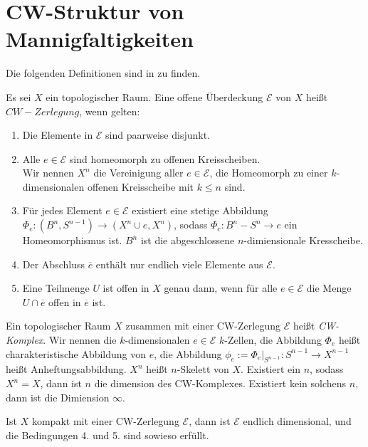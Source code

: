 \section{CW-Struktur von Mannigfaltigkeiten}

Die folgenden Definitionen sind in \cite{dold} zu finden.

\begin{definition}
    \label{def: cw-komplex}
    Es sei $X$ ein topologischer Raum. Eine offene Überdeckung $\mathcal{E}$ von $X$ heißt 
    $CW-Zerlegung$, wenn gelten:
    \begin{enumerate}
        \item Die Elemente in $\mathcal{E}$ sind paarweise disjunkt.
        \item Alle $e \in \mathcal{E}$ sind homeomorph zu offenen Kreisscheiben. \\
            Wir nennen $X^n$ die Vereinigung aller $e \in \mathcal{E}$, die Homeomorph zu einer
            $k$-dimensionalen offenen Kreisscheibe mit $k \leq n$ sind.
        \item Für jedes Element $e \in \mathcal{E}$ existiert eine stetige Abbildung
            $\Phi_e \colon (B^n, S^{n - 1}) \to (X^n \cup e, X^n)$, sodass 
            $\Phi_e \colon B^n - S^n \to e$ ein Homeomorphismus ist. $B^n$ ist die abgeschlossene 
            $n$-dimiensionale Kresscheibe.
        \item Der Abschluss $\overline{e}$ enthält nur endlich viele Elemente aus $\mathcal{E}$.
        \item Eine Teilmenge $U$ ist offen in $X$ genau dann, wenn für alle $e \in \mathcal{E}$ die
            Menge $U \cap \overline{e}$ offen in $\overline{e}$ ist. 
    \end{enumerate}
    
    Ein topologischer Raum $X$ zusammen mit einer CW-Zerlegung $\mathcal{E}$ heißt 
    \textit{CW-Komplex}.
    Wir nennen die $k$-dimensionalen $e \in \mathcal{E}$ $k$-Zellen, die Abbildung $\Phi_e$
    heißt charakteristische Abbildung von $e$, die Abbildung 
    $\phi_e := \Phi_e|_{S^{n - 1}} \colon S^{n - 1} \to X^{n - 1}$ heißt Anheftungsabbildung.
    $X^n$ heißt $n$-Skelett von $X$. Existiert ein $n$, sodass $X^n = X$, dann ist $n$ die 
    dimension des CW-Komplexes. Existiert kein solchens $n$, dann ist die Dimiension $\infty$.
\end{definition}

\begin{remark}
    Ist $X$ kompakt mit einer CW-Zerlegung $\mathcal{E}$, dann ist $\mathcal{E}$ endlich dimensional, 
    und die Bedingungen 4. und 5. sind sowieso erfüllt.
\end{remark}

